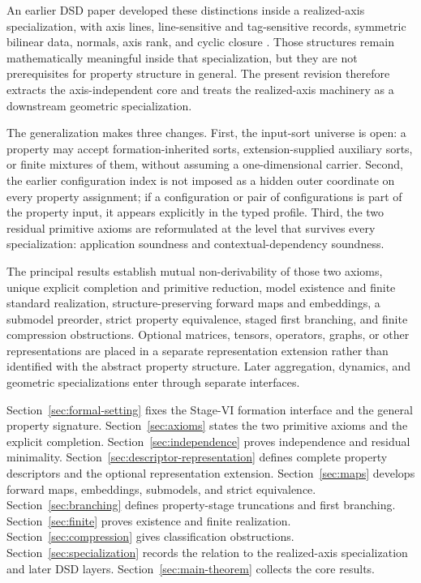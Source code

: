 \documentclass[11pt]{article}
\theoremstyle{definition}
\theoremstyle{remark}
\begin{document}
An earlier DSD paper developed these distinctions inside a realized-axis specialization, with axis lines, line-sensitive and tag-sensitive records, symmetric bilinear data, normals, axis rank, and cyclic closure \cite{KwonAxisProperty}.
Those structures remain mathematically meaningful inside that specialization, but they are not prerequisites for property structure in general.
The present revision therefore extracts the axis-independent core and treats the realized-axis machinery as a downstream geometric specialization.

The generalization makes three changes.
First, the input-sort universe is open: a property may accept formation-inherited sorts, extension-supplied auxiliary sorts, or finite mixtures of them, without assuming a one-dimensional carrier.
Second, the earlier configuration index is not imposed as a hidden outer coordinate on every property assignment; if a configuration or pair of configurations is part of the property input, it appears explicitly in the typed profile.
Third, the two residual primitive axioms are reformulated at the level that survives every specialization: application soundness and contextual-dependency soundness.

The principal results establish mutual non-derivability of those two axioms, unique explicit completion and primitive reduction, model existence and finite standard realization, structure-preserving forward maps and embeddings, a submodel preorder, strict property equivalence, staged first branching, and finite compression obstructions.
Optional matrices, tensors, operators, graphs, or other representations are placed in a separate representation extension rather than identified with the abstract property structure.
Later aggregation, dynamics, and geometric specializations enter through separate interfaces.

Section~\ref{sec:formal-setting} fixes the Stage-VI formation interface and the general property signature.
Section~\ref{sec:axioms} states the two primitive axioms and the explicit completion.
Section~\ref{sec:independence} proves independence and residual minimality.
Section~\ref{sec:descriptor-representation} defines complete property descriptors and the optional representation extension.
Section~\ref{sec:maps} develops forward maps, embeddings, submodels, and strict equivalence.
Section~\ref{sec:branching} defines property-stage truncations and first branching.
Section~\ref{sec:finite} proves existence and finite realization.
Section~\ref{sec:compression} gives classification obstructions.
Section~\ref{sec:specialization} records the relation to the realized-axis specialization and later DSD layers.
Section~\ref{sec:main-theorem} collects the core results.
\end{document}
